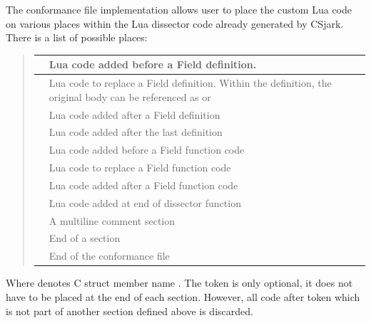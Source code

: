 \documentclass[A4paper,10pt,english]{sphinxmanual}
\begin{document}
The conformance file implementation allows user to place the custom Lua code on various places within the Lua dissector code already generated by CSjark. There is a list of possible places:
\begin{quote}

\begin{tabulary}{\linewidth}{|L|L|}
\hline

 & 
Lua code added before a Field definition.
\\\hline

 & 
Lua code to replace a Field definition. Within the definition, the original body can be referenced as  or 
\\\hline

 & 
Lua code added after a Field definition
\\\hline

 & 
Lua code added after the last definition
\\\hline

 & 
Lua code added before a Field function code
\\\hline

 & 
Lua code to replace a Field function code
\\\hline

 & 
Lua code added after a Field function code
\\\hline

 & 
Lua code added at end of dissector function
\\\hline

 & 
A multiline comment section
\\\hline

 & 
End of a section
\\\hline

 & 
End of the conformance file
\\\hline
\end{tabulary}

\end{quote}

Where  denotes C struct member name . The  token is only optional, it does not have to be placed at the end of each section. However, all code after  token which is not part of another section defined above is discarded.
\end{document}
